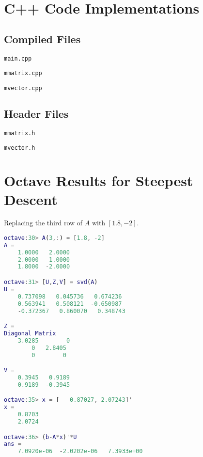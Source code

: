 \documentclass{article}
\begin{document}
\printbibliography


\appendix

\section{C++ Code Implementations}
\label{sec:cpp}

\subsection{Compiled Files}

\texttt{main.cpp}


\texttt{mmatrix.cpp}


\texttt{mvector.cpp}


\subsection{Header Files}

\texttt{mmatrix.h}


\texttt{mvector.h}



\section{Octave Results for Steepest Descent}
\label{sec:oct}
Replacing the third row of $A$ with $[1.8, -2]$.
\begin{lstlisting}[language=MATLAB]
octave:30> A(3,:) = [1.8, -2]
A =
    1.0000   2.0000
    2.0000   1.0000
    1.8000  -2.0000

octave:31> [U,Z,V] = svd(A)
U =
    0.737098   0.045736   0.674236
    0.563941   0.508121  -0.650987
    -0.372367   0.860070   0.348743

Z =
Diagonal Matrix
    3.0285        0
        0   2.8405
        0        0

V =
    0.3945   0.9189
    0.9189  -0.3945

octave:35> x = [   0.87027, 2.07243]'
x =
    0.8703
    2.0724

octave:36> (b-A*x)'*U
ans =
    7.0920e-06  -2.0202e-06   7.3933e+00
\end{lstlisting}
\end{document}
